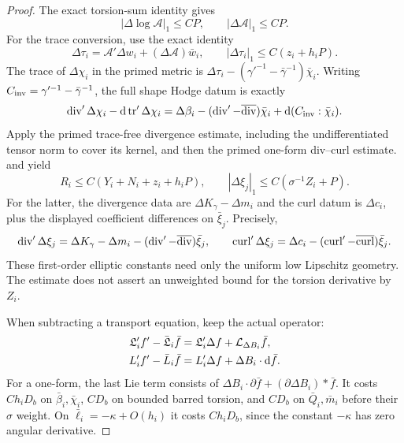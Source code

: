 \begin{proof}
The exact torsion-sum identity gives
\begin{equation}\label{dn:H-one}
 |\Delta\log\mathcal A|_1\le CP,
                   \qquad |\Delta\mathcal A|_1\le CP.
\end{equation}
For the trace conversion, use the exact identity
\begin{equation}\label{dn:trace-conversion}
 \Delta\tau_i=\mathcal A'\Delta w_i+
                      (\Delta\mathcal A)\bar w_i,
 \qquad |\Delta\tau_i|_1\le C(z_i+h_iP).
\end{equation}
The trace of $\Delta\chi_i$ in the primed metric is
$\Delta\tau_i-(\gamma'^{-1}-\bar\gamma^{-1})\bar\chi_i$.
Writing $C_{\rm inv}=\gamma'^{-1}-\bar\gamma^{-1}$, the full
shape Hodge datum is exactly
\[
 \operatorname{div}'\Delta\chi_i-\mathrm d\operatorname{tr}'\Delta\chi_i
 =\Delta\beta_i-(\operatorname{div}'-\overline{\operatorname{div}})\bar\chi_i
                              +\mathrm d(C_{\rm inv}:\bar\chi_i).
\]
Apply the primed trace-free divergence estimate, including the
undifferentiated tensor norm to cover its kernel, and then the
primed one-form div--curl estimate.  
and  yield
\begin{equation}\label{dn:difference-hodge}
 R_i\le C(Y_i+N_i+z_i+h_iP),\qquad
 |\Delta\xi_j|_1\le C(\sigma^{-1}Z_i+P).
\end{equation}
For the latter, the divergence data are
$\Delta K_\gamma-\Delta m_i$ and the curl datum is $\Delta c_i$,
plus the displayed coefficient differences on $\bar\xi_j$.
Precisely,
\[
 \operatorname{div}'\Delta\xi_j=\Delta K_\gamma-\Delta m_i
                  -(\operatorname{div}'-\overline{\operatorname{div}})\bar\xi_j,
 \qquad
 \operatorname{curl}'\Delta\xi_j=\Delta c_i
                  -(\operatorname{curl}'-\overline{\operatorname{curl}})\bar\xi_j.
\]
These first-order elliptic constants need only the uniform low
Lipschitz geometry.  The estimate does not assert an unweighted
bound for the torsion derivative by $Z_i$.

When subtracting a transport equation, keep the actual operator:
\begin{equation}\label{dn:transport-differences}
\begin{aligned}
 \mathfrak L_i'f'-\bar{\mathfrak L}_i\bar f
    &=\mathfrak L_i'\Delta f+\mathcal L_{\Delta B_i}\bar f,\\
 L_i'f'-\bar L_i\bar f&=L_i'\Delta f+
                                          \Delta B_i\cdot\mathrm d\bar f.
\end{aligned}
\end{equation}
For a one-form, the last Lie term consists of
$\Delta B_i\cdot\partial\bar f+(\partial\Delta B_i)*\bar f$.
It costs $Ch_iD_b$ on $\bar\beta_i,\bar\chi_i$, $CD_b$ on
bounded barred torsion, and $CD_b$ on $\bar Q_i,\bar m_i$ before
their $\sigma$ weight.  On $\bar\ell_i=-\kappa+O(h_i)$ it costs
$Ch_iD_b$, since the constant $-\kappa$ has zero angular derivative.


\end{proof}
